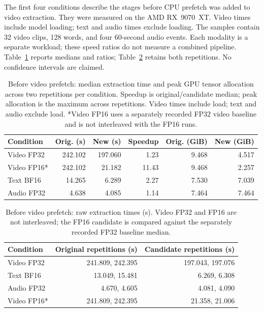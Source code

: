 The first four conditions describe the stages before CPU prefetch was added to video extraction. They were measured on the AMD RX~9070~XT. Video times include model loading; text and audio times exclude loading. The samples contain 32 video clips, 128 words, and four 60-second audio events. Each modality is a separate workload; these speed ratios do not measure a combined pipeline. Table~\ref{tab:features-performance} reports medians and ratios; Table~\ref{tab:features-raw} retains both repetitions. No confidence intervals are claimed.

\begin{table}[htbp]\centering\sffamily\small
\caption{Before video prefetch: median extraction time and peak GPU tensor allocation across two repetitions per condition. Speedup is original/candidate median; peak allocation is the maximum across repetitions. Video times include load; text and audio exclude load. *Video FP16 uses a separately recorded FP32 video baseline and is not interleaved with the FP16 runs.}\label{tab:features-performance}
\begin{tabular}{@{}lrrrrr@{}}\toprule
Condition & Orig. (s) & New (s) & Speedup & Orig. (GiB) & New (GiB) \\\midrule
Video FP32 & 242.102 & 197.060 & 1.23 & 9.468 & 4.517 \\
Video FP16* & 242.102 & 21.182 & 11.43 & 9.468 & 2.257 \\
Text BF16 & 14.265 & 6.289 & 2.27 & 7.530 & 7.039 \\
Audio FP32 & 4.638 & 4.085 & 1.14 & 7.464 & 7.464 \\
\bottomrule\end{tabular}\end{table}

\begin{table}[htbp]\centering\sffamily\small
\caption{Before video prefetch: raw extraction times (s). Video FP32 and FP16 are not interleaved; the FP16 candidate is compared against the separately recorded FP32 baseline median.}\label{tab:features-raw}
\begin{tabular}{@{}lrr@{}}\toprule
Condition & Original repetitions (s) & Candidate repetitions (s) \\\midrule
Video FP32 & 241.809, 242.395 & 197.043, 197.076 \\
Text BF16 & 13.049, 15.481 & 6.269, 6.308 \\
Audio FP32 & 4.670, 4.605 & 4.081, 4.090 \\
Video FP16* & 241.809, 242.395 & 21.358, 21.006 \\
\bottomrule\end{tabular}\end{table}

